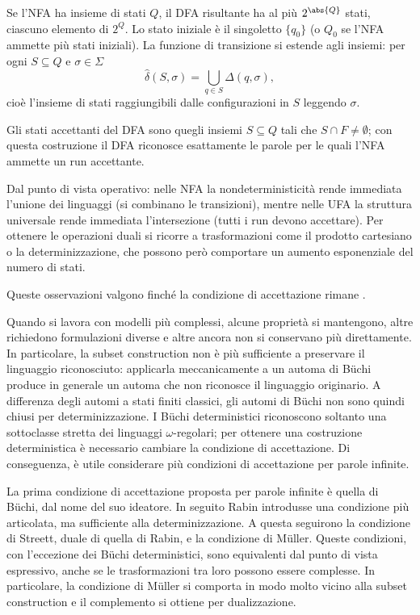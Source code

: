 Se l'NFA ha insieme di stati \(Q\), il DFA risultante ha al più \(2^{\abs{Q}}\) stati, ciascuno elemento di \(2^{Q}\). Lo stato iniziale è il singoletto \(\{q_0\}\) (o \(Q_0\) se l'NFA ammette più stati iniziali). La funzione di transizione si estende agli insiemi: per ogni \(S\subseteq Q\) e \(\sigma\in\Sigma\)
\[
  \hat{\delta}(S,\sigma)=\bigcup_{q\in S}\Delta(q,\sigma),
\]
cioè l'insieme di stati raggiungibili dalle configurazioni in \(S\) leggendo \(\sigma\).

Gli stati accettanti del DFA sono quegli insiemi \(S\subseteq Q\) tali che \(S\cap F\neq\emptyset\); con questa costruzione il DFA riconosce esattamente le parole per le quali l'NFA ammette un run accettante.

Dal punto di vista operativo: nelle NFA la nondeterministicità rende immediata l'unione dei linguaggi (si combinano le transizioni), mentre nelle UFA la struttura universale rende immediata l'intersezione (tutti i run devono accettare). Per ottenere le operazioni duali si ricorre a trasformazioni come il prodotto cartesiano o la determinizzazione, che possono però comportare un aumento esponenziale del numero di stati.

Queste osservazioni valgono finché la condizione di accettazione rimane .

Quando si lavora con modelli più complessi, alcune proprietà si mantengono, altre richiedono formulazioni diverse e altre ancora non si conservano più direttamente. In particolare, la subset construction non è più sufficiente a preservare il linguaggio riconosciuto: applicarla meccanicamente a un automa di Büchi produce in generale un automa che non riconosce il linguaggio originario. A differenza degli automi a stati finiti classici, gli automi di Büchi non sono quindi chiusi per determinizzazione. I Büchi deterministici riconoscono soltanto una sottoclasse stretta dei linguaggi \(\omega\)-regolari; per ottenere una costruzione deterministica è necessario cambiare la condizione di accettazione. Di conseguenza, è utile considerare più condizioni di accettazione per parole infinite.

La prima condizione di accettazione proposta per parole infinite è quella di Büchi, dal nome del suo ideatore. In seguito Rabin introdusse una condizione più articolata, ma sufficiente alla determinizzazione. A questa seguirono la condizione di Streett, duale di quella di Rabin, e la condizione di Müller. Queste condizioni, con l'eccezione dei Büchi deterministici, sono equivalenti dal punto di vista espressivo, anche se le trasformazioni tra loro possono essere complesse. In particolare, la condizione di Müller si comporta in modo molto vicino alla subset construction e il complemento si ottiene per dualizzazione.

